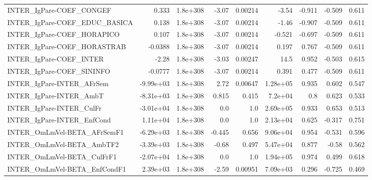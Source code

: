 \begin{tabular}{lrrrrrrrr}
INTER\_IgPare-COEF\_CONGEF              &       0.333 &     1.8e+308 &   -3.07 &  0.00214 &      -3.54 &      -0.911 &       -0.509 &         0.611 \\
INTER\_IgPare-COEF\_EDUC\_BASICA         &       0.138 &     1.8e+308 &   -3.07 &  0.00214 &      -1.46 &      -0.907 &       -0.509 &         0.611 \\
INTER\_IgPare-COEF\_HORAPICO            &       0.107 &     1.8e+308 &   -3.07 &  0.00214 &     -0.521 &      -0.697 &       -0.509 &         0.611 \\
INTER\_IgPare-COEF\_HORASTRAB           &     -0.0388 &     1.8e+308 &   -3.07 &  0.00214 &      0.197 &       0.767 &       -0.509 &         0.611 \\
INTER\_IgPare-COEF\_INTER               &       -2.28 &     1.8e+308 &   -3.03 &  0.00247 &       14.5 &       0.952 &       -0.503 &         0.615 \\
INTER\_IgPare-COEF\_SININFO             &     -0.0777 &     1.8e+308 &   -3.07 &  0.00214 &      0.391 &       0.477 &       -0.509 &         0.611 \\
INTER\_IgPare-INTER\_AFrSem             &   -9.99e+03 &     1.8e+308 &    2.72 &  0.00647 &   1.28e+05 &       0.935 &        0.602 &         0.547 \\
INTER\_IgPare-INTER\_AmbT               &   -8.31e+03 &     1.8e+308 &   0.815 &    0.415 &    7.2e+04 &         0.8 &        0.623 &         0.533 \\
INTER\_IgPare-INTER\_CulFr              &   -3.01e+04 &     1.8e+308 &     0.0 &      1.0 &   2.69e+05 &       0.933 &        0.653 &         0.513 \\
INTER\_IgPare-INTER\_EnfCond            &    1.11e+04 &     1.8e+308 &     0.0 &      1.0 &   2.13e+04 &       0.625 &       -0.317 &         0.751 \\
INTER\_OmLmVel-BETA\_AFrSemF1           &   -6.29e+03 &     1.8e+308 &  -0.445 &    0.656 &   9.06e+04 &       0.954 &       -0.531 &         0.596 \\
INTER\_OmLmVel-BETA\_AmbTF2             &   -3.39e+03 &     1.8e+308 &   -0.68 &    0.497 &   5.47e+04 &       0.877 &        -0.58 &         0.562 \\
INTER\_OmLmVel-BETA\_CulFrF1            &   -2.07e+04 &     1.8e+308 &     0.0 &      1.0 &   1.94e+05 &       0.974 &        0.499 &         0.618 \\
INTER\_OmLmVel-BETA\_EnfCondF1          &    2.39e+03 &     1.8e+308 &   -2.59 &  0.00951 &   7.09e+03 &       0.296 &       -0.725 &         0.469 \\

\end{tabular}
